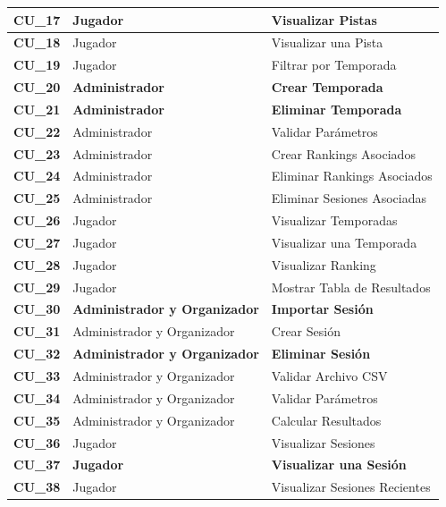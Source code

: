 \begin{center}
\begin{tabular}{| p{1.5cm} | p{6.5cm} | p{5.5cm} |}
    {\textbf{CU\_17}} & Jugador & Visualizar Pistas\\ \hline
    {\textbf{CU\_18}} & Jugador & Visualizar una Pista\\ \hline
    {\textbf{CU\_19}} & Jugador & Filtrar por Temporada\\ \hline
    
    {\textbf{CU\_20}} & \textbf{Administrador} & \textbf{Crear Temporada}\\ \hline
    {\textbf{CU\_21}} & \textbf{Administrador} & \textbf{Eliminar Temporada}\\ \hline
    {\textbf{CU\_22}} & Administrador & Validar Parámetros\\\hline
    {\textbf{CU\_23}} & Administrador & Crear Rankings Asociados\\ \hline
    {\textbf{CU\_24}} & Administrador & Eliminar Rankings Asociados\\ \hline
    {\textbf{CU\_25}} & Administrador & Eliminar Sesiones Asociadas\\ \hline
    
    {\textbf{CU\_26}} & Jugador & Visualizar Temporadas\\ \hline
    {\textbf{CU\_27}} & Jugador & Visualizar una Temporada\\ \hline
    {\textbf{CU\_28}} & Jugador & Visualizar Ranking\\ \hline
    {\textbf{CU\_29}} & Jugador & Mostrar Tabla de Resultados\\ \hline
    
    {\textbf{CU\_30}} & \textbf{Administrador y Organizador} & \textbf{Importar Sesión}\\ \hline
    {\textbf{CU\_31}} & Administrador y Organizador & Crear Sesión\\ \hline
    {\textbf{CU\_32}} & \textbf{Administrador y Organizador} & \textbf{Eliminar Sesión}\\ \hline
    {\textbf{CU\_33}} & Administrador y Organizador & Validar Archivo CSV\\ \hline
    {\textbf{CU\_34}} & Administrador y Organizador & Validar Parámetros\\ \hline
    {\textbf{CU\_35}} & Administrador y Organizador & Calcular Resultados\\ \hline
    
    {\textbf{CU\_36}} & Jugador & Visualizar Sesiones\\ \hline
    {\textbf{CU\_37}} & \textbf{Jugador} & \textbf{Visualizar una Sesión}\\ \hline
    {\textbf{CU\_38}} & Jugador & Visualizar Sesiones Recientes\\ \hline
  \end{tabular}
  
  \label{table:usecase:specification}
\end{center}

